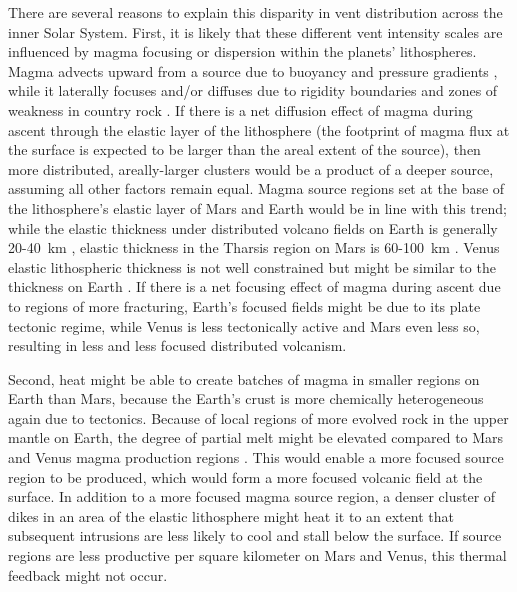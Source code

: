 There are several reasons to explain this disparity in vent distribution across the inner Solar System. First, it is likely that these different vent intensity scales are influenced by magma focusing or dispersion within the planets' lithospheres. Magma advects upward from a source due to buoyancy and pressure gradients \citep{lister1991fluid}, while it laterally focuses and/or diffuses due to rigidity boundaries and zones of weakness in country rock \citep{hebert2010generation,bonafede1998porous}. If there is a net diffusion effect of magma during ascent through the elastic layer of the lithosphere (the footprint of magma flux at the surface is expected to be larger than the areal extent of the source), then more distributed, areally-larger clusters would be a product of a deeper source, assuming all other factors remain equal. Magma source regions set at the base of the lithosphere's elastic layer of Mars and Earth would be in line with this trend; while the elastic thickness under distributed volcano fields on Earth is generally 20-40~km \citep{kiyosugi2010relationships}, elastic thickness in the Tharsis region on Mars is 60-100~km \citep{neumann2004crustal}. Venus elastic lithospheric thickness is not well constrained \citep{anderson2006global} but might be similar to the thickness on Earth \citep{nimmo1998volcanism}. If there is a net focusing effect of magma during ascent due to regions of more fracturing, Earth's focused fields might be due to its plate tectonic regime, while Venus is less tectonically active and Mars even less so, resulting in less and less focused distributed volcanism.

Second, heat might be able to create batches of magma in smaller regions on Earth than Mars, because the Earth's crust is more chemically heterogeneous again due to tectonics. Because of local regions of more evolved rock in the upper mantle on Earth, the degree of partial melt might be elevated compared to Mars and Venus magma production regions \citep{annen2006genesis}. This would enable a more focused source region to be produced, which would form a more focused volcanic field at the surface. In addition to a more focused magma source region, a denser cluster of dikes in an area of the elastic lithosphere might heat it to an extent that subsequent intrusions are less likely to cool and stall below the surface. If source regions are less productive per square kilometer on Mars and Venus, this thermal feedback might not occur.


